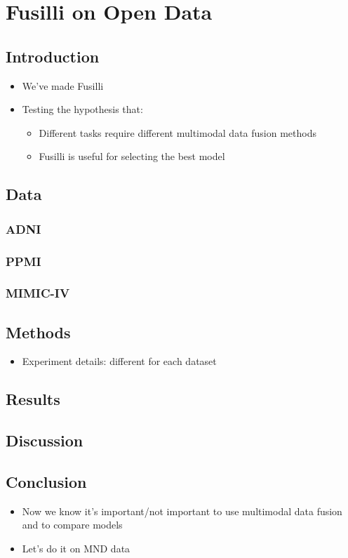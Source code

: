 \chapter{Fusilli on Open Data}
\label{fusilli_on_open_data}

\section{Introduction}
\begin{itemize}
    \item We've made Fusilli
    \item Testing the hypothesis that:
    \begin{itemize}
        \item Different tasks require different multimodal data fusion methods
        \item Fusilli is useful for selecting the best model
    \end{itemize}
\end{itemize}

\section{Data}
\subsection{ADNI}
\subsection{PPMI}
\subsection{MIMIC-IV}

\section{Methods}
\begin{itemize}
    \item Experiment details: different for each dataset
\end{itemize}

\section{Results}

\section{Discussion}

\section{Conclusion}
\begin{itemize}
    \item Now we know it's important/not important to use multimodal data fusion and to compare models
    \item Let's do it on MND data
\end{itemize}
